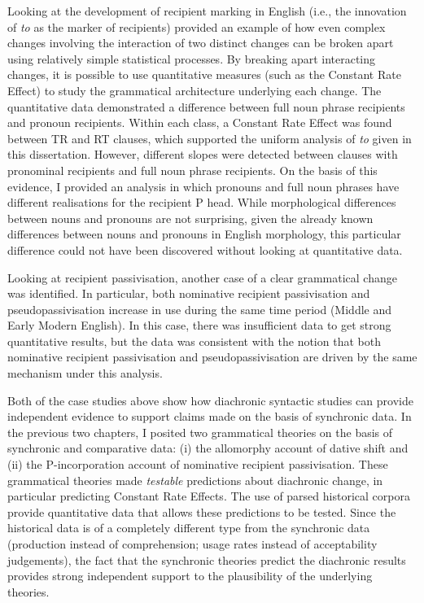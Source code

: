 	Looking at the development of recipient marking in English (i.e., the innovation of \textit{to} as the marker of recipients) provided an example of how even complex changes involving the interaction of two distinct changes can be broken apart using relatively simple statistical processes. By breaking apart interacting changes, it is possible to use quantitative measures (such as the Constant Rate Effect) to study the grammatical architecture underlying each change. The quantitative data demonstrated a difference between full noun phrase recipients and pronoun recipients. Within each class, a Constant Rate Effect was found between TR and RT clauses, which supported the uniform analysis of \textit{to} given in this dissertation. However, different slopes were detected between clauses with pronominal recipients and full noun phrase recipients. On the basis of this evidence, I provided an analysis in which pronouns and full noun phrases have different realisations for the recipient P head. While morphological differences between nouns and pronouns are not surprising, given the already known differences between nouns and pronouns in English morphology, this particular difference could not have been discovered without looking at quantitative data.
	
	Looking at recipient passivisation, another case of a clear grammatical change was identified. In particular, both nominative recipient passivisation and pseudopassivisation increase in use during the same time period (Middle and Early Modern English). In this case, there was insufficient data to get strong quantitative results, but the data was consistent with the notion that both nominative recipient passivisation and pseudopassivisation are driven by the same mechanism under this analysis.

	Both of the case studies above show how diachronic syntactic studies can provide independent evidence to support claims made on the basis of synchronic data. In the previous two chapters, I posited two grammatical theories on the basis of synchronic and comparative data: (i) the allomorphy account of dative shift and (ii) the P-incorporation account of nominative recipient passivisation. These grammatical theories made \textit{testable} predictions about diachronic change, in particular predicting Constant Rate Effects. The use of parsed historical corpora provide quantitative data that allows these predictions to be tested. Since the historical data is of a completely different type from the synchronic data (production instead of comprehension; usage rates instead of acceptability judgements), the fact that the synchronic theories predict the diachronic results provides strong independent support to the plausibility of the underlying theories.


